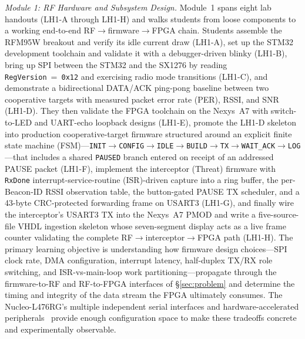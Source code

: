 \documentclass[conference]{IEEEtran}
\begin{document}
\textit{Module 1: RF Hardware and Subsystem Design.} Module~1 spans eight lab handouts (LH1-A through LH1-H) and walks students from loose components to a working end-to-end RF$\rightarrow$firmware$\rightarrow$FPGA chain. Students assemble the RFM95W breakout and verify its idle current draw (LH1-A), set up the STM32 development toolchain and validate it with a debugger-driven blinky (LH1-B), bring up SPI between the STM32 and the SX1276 by reading \texttt{RegVersion}~=~\texttt{0x12} and exercising radio mode transitions (LH1-C), and demonstrate a bidirectional DATA/ACK ping-pong baseline between two cooperative targets with measured packet error rate (PER), RSSI, and SNR (LH1-D). They then validate the FPGA toolchain on the Nexys~A7 with switch-to-LED and UART-echo loopback designs (LH1-E), promote the LH1-D skeleton into production cooperative-target firmware structured around an explicit finite state machine (FSM)---\texttt{INIT}$\rightarrow$\texttt{CONFIG}$\rightarrow$\texttt{IDLE}$\rightarrow$\texttt{BUILD}$\rightarrow$\texttt{TX}$\rightarrow$\texttt{WAIT\_ACK}$\rightarrow$\texttt{LOG}---that includes a shared \texttt{PAUSED} branch entered on receipt of an addressed PAUSE packet (LH1-F), implement the interceptor (Threat) firmware with \texttt{RxDone} interrupt-service-routine (ISR)-driven capture into a ring buffer, the per-Beacon-ID RSSI observation table, the button-gated PAUSE TX scheduler, and a 43-byte CRC-protected forwarding frame on USART3 (LH1-G), and finally wire the interceptor's USART3 TX into the Nexys~A7 PMOD and write a five-source-file VHDL ingestion skeleton whose seven-segment display acts as a live frame counter validating the complete RF$\rightarrow$interceptor$\rightarrow$FPGA path (LH1-H). The primary learning objective is understanding how firmware design choices---SPI clock rate, DMA configuration, interrupt latency, half-duplex TX/RX role switching, and ISR-vs-main-loop work partitioning---propagate through the firmware-to-RF and RF-to-FPGA interfaces of \S\ref{sec:problem} and determine the timing and integrity of the data stream the FPGA ultimately consumes. The Nucleo-L476RG's multiple independent serial interfaces and hardware-accelerated peripherals~\cite{b10} provide enough configuration space to make these tradeoffs concrete and experimentally observable.
\end{document}
